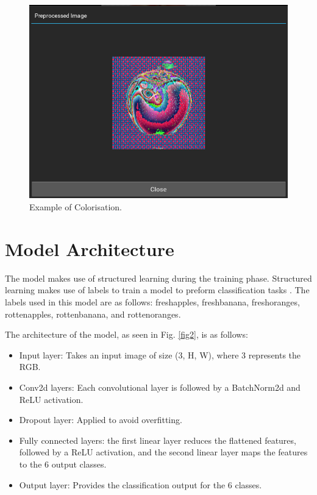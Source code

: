 \documentclass[conference]{IEEEtran}
\begin{document}
\begin{figure}[h]
    \centering
    \includegraphics[width=\linewidth]{Pre-pros_image.png}
    \caption{Example of Colorisation.}
    \label{fig1}
\end{figure}

\section{Model Architecture}

The model makes use of structured learning during the training phase. Structured learning makes use of labels to train a model to preform classification tasks \cite{b1}. The labels used in this model are as follows: freshapples, freshbanana, freshoranges, rottenapples, rottenbanana, and rottenoranges.

The architecture of the model, as seen in Fig. \ref{fig2}, is as follows:
\begin{itemize}
    \item Input layer: Takes an input image of size (3, H, W), where 3 represents the RGB.
    \item Conv2d layers: Each convolutional layer is followed by a BatchNorm2d and ReLU activation.
    \item Dropout layer: Applied to avoid overfitting.
    \item Fully connected layers: the first linear layer reduces the flattened features, followed by a ReLU activation, and the second linear layer maps the features to the 6 output classes.
    \item Output layer: Provides the classification output for the 6 classes.
\end{itemize}
\end{document}
